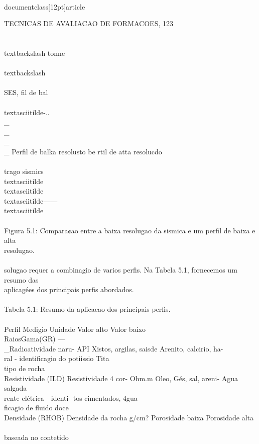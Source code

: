 \\documentclass[12pt]{article}
\begin{document}
{TECNICAS DE AVALIACAO DE FORMACOES, 123\\
\\
\\textbackslash{} tonne\\
\\textbackslash{}\\
\\
SES, fil de bal\\
\\textasciitilde{}-..\\_\\_\\_\\_ Perfil de balka resolusto be rtil de atta resolucdo\\
\\
trago sismics\\textasciitilde{}\\textasciitilde{}\\textasciitilde{}------\\textasciitilde{}\\
\\
Figura 5.1: Compara¢ao entre a baixa resolugao da sismica e um perfil de baixa e alta\\
resolugao.\\
\\
solugao requer a combinagio de varios perfis. Na Tabela 5.1, fornecemos um resumo das\\
aplicagées dos principais perfis abordados.\\
\\
Tabela 5.1: Resumo da aplicacao dos principais perfis.\\
\\
Perfil Medigio Unidade Valor alto Valor baixo\\
RaiosGama(GR) —\\_Radioatividade naru- API Xistos, argilas, saisde Arenito, calcirio, ha-\\
ral - identificagio do potiissio Tita\\
tipo de rocha\\
Resistividade (ILD) Resistividade 4 cor- Ohm.m Oleo, Gés, sal, areni- Agua salgada\\
rente elétrica - identi- tos cimentados, 4gua\\
ficagio de fluido doce\\
Densidade (RHOB) Densidade da rocha g/cm? Porosidade baixa Porosidade alta\\
\\
baseada no contetido\\
}
\end{document}
